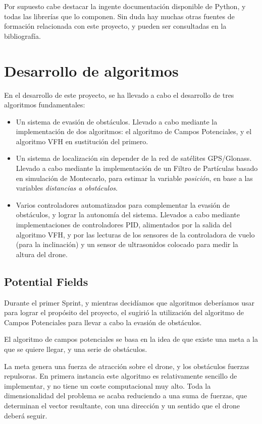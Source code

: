 Por supuesto cabe destacar la ingente documentación disponible de Python, y todas las librerías que lo componen.
Sin duda hay muchas otras fuentes de formación relacionada con este proyecto, y pueden ser consultadas en la bibliografía. 



\section{Desarrollo de algoritmos}

En el desarrollo de este proyecto, se ha llevado a cabo el desarrollo de tres algoritmos fundamentales: 

\begin{itemize}

\item Un sistema de evasión de obstáculos. Llevado a cabo mediante la implementación de dos algoritmos: el algoritmo de Campos Potenciales, y el algoritmo VFH en sustitución del primero.
\item Un sistema de localización sin depender de la red de satélites GPS/Glonass. Llevado a cabo mediante la implementación de un Filtro de Partículas basado en simulación de Montecarlo, para estimar la variable \emph{posición}, en base a las variables \emph{distancias a obstáculos}.
\item Varios controladores automatizados para complementar la evasión de obstáculos, y lograr la autonomía del sistema. Llevados a cabo mediante implementaciones de controladores PID, alimentados por la salida del algoritmo VFH, y por las lecturas de los sensores de la controladora de vuelo (para la inclinación) y un sensor de ultrasonidos colocado para medir la altura del drone.
\end{itemize}

\subsection{Potential Fields}

Durante el primer Sprint, y mientras decidíamos que algoritmos deberíamos usar para lograr el propósito del proyecto, el \tutor{} sugirió la utilización del algoritmo de Campos Potenciales para llevar a cabo la evasión de obstáculos.

El algoritmo de campos potenciales se basa en la idea de que existe una meta a la que se quiere llegar, y una serie de obstáculos. 

La meta genera una fuerza de atracción sobre el drone, y los obstáculos fuerzas repulsoras. 
En primera instancia este algoritmo es relativamente sencillo de implementar, y no tiene un coste computacional muy alto. Toda la dimensionalidad del problema se acaba reduciendo a una suma de fuerzas, que determinan el vector resultante, con una dirección y un sentido que el drone deberá seguir. 

